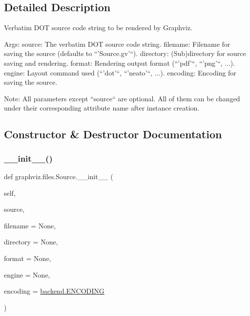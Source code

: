 \subsection{Detailed Description}
\begin{DoxyVerb}Verbatim DOT source code string to be rendered by Graphviz.

Args:
    source: The verbatim DOT source code string.
    filename: Filename for saving the source (defaults to ``'Source.gv'``).
    directory: (Sub)directory for source saving and rendering.
    format: Rendering output format (``'pdf'``, ``'png'``, ...).
    engine: Layout command used (``'dot'``, ``'neato'``, ...).
    encoding: Encoding for saving the source.

Note:
    All parameters except ``source`` are optional. All of them can be changed
    under their corresponding attribute name after instance creation.
\end{DoxyVerb}
 

\subsection{Constructor \& Destructor Documentation}
\mbox{\label{classgraphviz_1_1files_1_1Source_a112ffc61105ddbba9baa2e7de8a74690}} 
\subsubsection{\texorpdfstring{\+\_\+\+\_\+init\+\_\+\+\_\+()}{\_\_init\_\_()}}
{\footnotesize\ttfamily def graphviz.\+files.\+Source.\+\_\+\+\_\+init\+\_\+\+\_\+ (\begin{DoxyParamCaption}\item[{}]{self,  }\item[{}]{source,  }\item[{}]{filename = {\ttfamily None},  }\item[{}]{directory = {\ttfamily None},  }\item[{}]{format = {\ttfamily None},  }\item[{}]{engine = {\ttfamily None},  }\item[{}]{encoding = {\ttfamily \hyperlink{namespacegraphviz_1_1backend_aaa5c3555a484c96a0b0e5356ce3a577d}{backend.\+E\+N\+C\+O\+D\+I\+NG}} }\end{DoxyParamCaption})}




